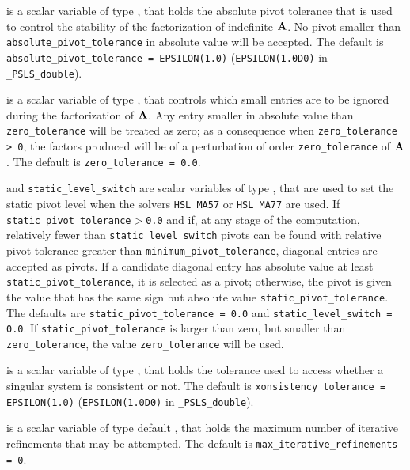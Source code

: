 \documentclass{galahad}
\newcommand{\packagename}{PSLS}
\newcommand{\fullpackagename}{\libraryname\_\-\packagename}
\begin{document}
\begin{description}
 is a scalar variable of type \realdp, that
holds the absolute pivot tolerance that is used to control the
stability of the factorization of indefinite ${\mathbf{A}}$.
No pivot smaller than {\tt absolute\_pivot\_tolerance} in
absolute value will be accepted.
The default is {\tt absolute\_pivot\_\-tolerance = EPSILON(1.0)}
({\tt EPSILON(1.0D0)} in {\tt \fullpackagename\_double}).

 is a scalar variable of type \realdp, that
controls which small entries are to be ignored during the factorization
of ${\mathbf{A}}$. Any entry smaller in absolute value than
{\tt zero\_\-tolerance} will be treated as zero; as a consequence when
{\tt zero\_tolerance > 0}, the factors produced will be of a perturbation
of order {\tt zero\_tolerance} of ${\mathbf{A}}$.
The default is {\tt zero\_tolerance = 0.0}.

 and {\tt static\_level\_switch} are
scalar variables of type \realdp, that are used to set the static pivot
level when the solvers {\tt HSL\_MA57} or {\tt HSL\_MA77} are used.
If {\tt static\_pivot\_tolerance$>$0.0} and if,
at any stage of the computation, relatively fewer
than {\tt static\_level\_\-switch}
pivots can be found with relative pivot tolerance greater than
{\tt minimum\_pivot\_tolerance},  diagonal entries are accepted as pivots. If
a candidate diagonal entry has absolute value
at least {\tt static\_pivot\_tolerance}, it is
selected as a pivot; otherwise, the pivot is given the value
that has the same sign but absolute value {\tt static\_pivot\_tolerance}.
The defaults are {\tt static\_pivot\_tolerance = 0.0} and
{\tt static\_level\_switch = 0.0}.
If {\tt static\_pivot\_tolerance}
is larger than zero, but smaller than {\tt zero\_tolerance},
the value {\tt zero\_\-tolerance} will be used.

 is a scalar variable of type \realdp, that holds
the tolerance used to access whether a singular system is consistent or not.
The default is {\tt xonsistency\_\-tolerance = EPSILON(1.0)}
({\tt EPSILON(1.0D0)} in {\tt \fullpackagename\_double}).

 is a scalar variable of type default
\integer, that holds
the maximum number of iterative refinements that may be attempted.
The default is {\tt max\_iterative\_refinements = 0}.


\end{description}
\end{document}
